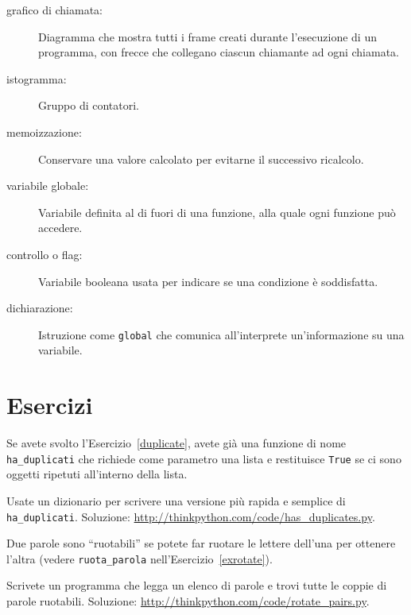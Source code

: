 \documentclass[10pt]{book}
\begin{document}
\begin{description}
\item[grafico di chiamata:] Diagramma che mostra tutti i frame creati durante l'esecuzione di un programma, con frecce che collegano ciascun chiamante ad ogni chiamata.

\item[istogramma:] Gruppo di contatori.

\item[memoizzazione:] Conservare una valore calcolato per evitarne il successivo ricalcolo.

\item[variabile globale:]  Variabile definita al di fuori di una funzione, alla quale ogni funzione può accedere.

\item[controllo o flag:] Variabile booleana usata per indicare se una condizione è soddisfatta.

\item[dichiarazione:] Istruzione come {\tt global} che comunica all'interprete un'informazione su una variabile.

\end{description}

\section{Esercizi}

\begin{exercise}

Se avete svolto l'Esercizio~\ref{duplicate}, avete già una funzione di nome \verb"ha_duplicati" che richiede come parametro una lista e restituisce {\tt True} se ci sono oggetti ripetuti all'interno della lista.

Usate un dizionario per scrivere una versione più rapida e semplice di
\verb"ha_duplicati". 
Soluzione: \url{http://thinkpython.com/code/has_duplicates.py}.

\end{exercise}

\vspace{0.2in}
\begin{exercise}
\label{exrotatepairs}

Due parole sono ``ruotabili'' se potete far ruotare le lettere dell'una per ottenere l'altra (vedere \verb"ruota_parola" nell'Esercizio~\ref{exrotate}).

Scrivete un programma che legga un elenco di parole e trovi tutte le coppie di parole ruotabili. Soluzione: \url{http://thinkpython.com/code/rotate_pairs.py}.

\end{exercise}
\end{document}
